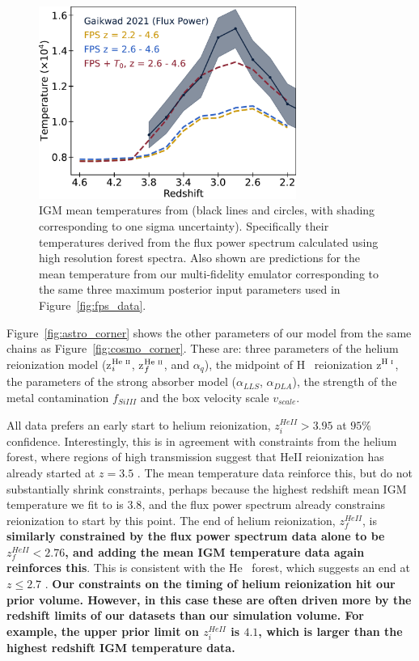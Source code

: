 \begin{figure}
    \centering
    \includegraphics[width=0.75\textwidth]{figures/t0_best_fit.pdf}
    \caption{\label{fig:temp_data}
    IGM mean temperatures from \protect\cite{2021MNRAS.506.4389G} (black lines and circles, with shading corresponding to one sigma uncertainty).
    Specifically their temperatures derived from the flux power spectrum calculated using high resolution \lya forest spectra.
    Also shown are predictions for the mean temperature from our multi-fidelity emulator corresponding to the same three maximum posterior input parameters used in Figure~\protect\ref{fig:fps_data}.
    }
\end{figure}

Figure~\ref{fig:astro_corner} shows the other parameters of our model from the same chains as Figure~\ref{fig:cosmo_corner}.
These are: three parameters of the helium reionization model (z$^{\text{He~{\sc ii}}}_i$, z$^{\text{He~{\sc ii}}}_f$, and $\alpha_q$), the midpoint of H~{} reionization z$^{\text{H~{\sc i}}}$, the parameters of the strong absorber model ($\alpha_{LLS}$, $\alpha_{DLA}$), the strength of the metal contamination $f_{SiIII}$ and the box velocity scale $v_{scale}$.

All data prefers an early start to helium reionization, $z_i^{HeII} > 3.95$ at $95\%$ confidence.
Interestingly, this is in agreement with constraints from the helium \lya forest, where regions of high transmission suggest that HeII reionization has already started at $z = 3.5$ \cite{2016ApJ...825..144W, 2021ApJ...912...38M}.
The mean temperature data reinforce this, but do not substantially shrink constraints, perhaps because the highest redshift mean IGM temperature we fit to is $3.8$, and the flux power spectrum already constrains reionization to start by this point.
The end of helium reionization, $z_f^{HeII}$, is \textbf{similarly constrained by the flux power spectrum data alone to be $z_f^{HeII} < 2.76$, and adding the mean IGM temperature data again reinforces this}.
This is consistent with the He~{} \lya forest, which suggests an end at $z \leq 2.7$ \cite{2009ApJ...704L..89M, 2011ApJ...733L..24W, 2019ApJ...875..111W}.
\textbf{Our constraints on the timing of helium reionization hit our prior volume. However, in this case these are often driven more by the redshift limits of our datasets than our simulation volume. For example, the upper prior limit on $z^{HeII}_i$ is $4.1$, which is larger than the highest redshift IGM temperature data.}

